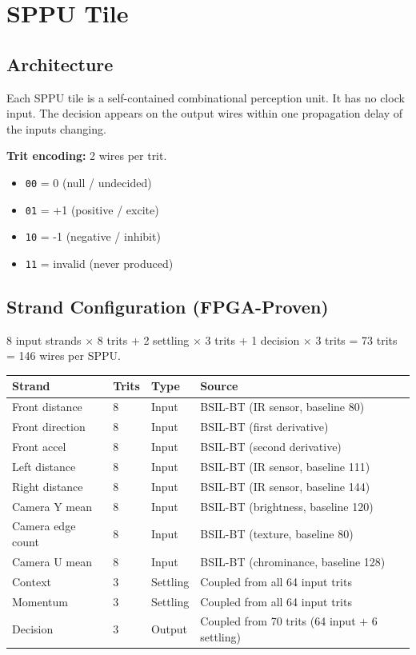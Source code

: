 \documentclass[11pt, a4paper]{article}
\begin{document}
\section{SPPU Tile}

\subsection{Architecture}

Each SPPU tile is a self-contained combinational perception unit.
It has no clock input. The decision appears on the output wires
within one propagation delay of the inputs changing.

\textbf{Trit encoding:} 2 wires per trit.
\begin{itemize}[nosep]
  \item \texttt{00} = 0 (null / undecided)
  \item \texttt{01} = +1 (positive / excite)
  \item \texttt{10} = -1 (negative / inhibit)
  \item \texttt{11} = invalid (never produced)
\end{itemize}

\subsection{Strand Configuration (FPGA-Proven)}

8 input strands $\times$ 8 trits + 2 settling $\times$ 3 trits + 1 decision $\times$ 3 trits
= 73 trits = 146 wires per SPPU.

\begin{center}
\begin{tabular}{@{}llll@{}}
\toprule
\textbf{Strand} & \textbf{Trits} & \textbf{Type} & \textbf{Source} \\
\midrule
Front distance   & 8 & Input   & BSIL-BT (IR sensor, baseline 80) \\
Front direction  & 8 & Input   & BSIL-BT (first derivative) \\
Front accel      & 8 & Input   & BSIL-BT (second derivative) \\
Left distance    & 8 & Input   & BSIL-BT (IR sensor, baseline 111) \\
Right distance   & 8 & Input   & BSIL-BT (IR sensor, baseline 144) \\
Camera Y mean    & 8 & Input   & BSIL-BT (brightness, baseline 120) \\
Camera edge count & 8 & Input  & BSIL-BT (texture, baseline 80) \\
Camera U mean    & 8 & Input   & BSIL-BT (chrominance, baseline 128) \\
Context          & 3 & Settling & Coupled from all 64 input trits \\
Momentum         & 3 & Settling & Coupled from all 64 input trits \\
Decision         & 3 & Output  & Coupled from 70 trits (64 input + 6 settling) \\
\bottomrule
\end{tabular}
\end{center}
\end{document}
